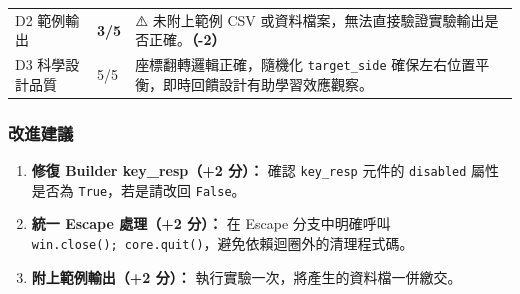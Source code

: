 \documentclass[14pt,]{extarticle}
\providecommand{\tightlist}{%
  \setlength{\itemsep}{0pt}\setlength{\parskip}{0pt}}
\begin{document}
\begin{longtable}[]{@{}lll@{}}
\begin{minipage}[t]{0.07\columnwidth}\raggedright
D2 範例輸出\strut
\end{minipage} & \begin{minipage}[t]{0.03\columnwidth}\raggedright
\textbf{3/5}\strut
\end{minipage} & \begin{minipage}[t]{0.82\columnwidth}\raggedright
⚠️ 未附上範例 CSV
或資料檔案，無法直接驗證實驗輸出是否正確。\textbf{（-2）}\strut
\end{minipage}\tabularnewline
\begin{minipage}[t]{0.07\columnwidth}\raggedright
D3 科學設計品質\strut
\end{minipage} & \begin{minipage}[t]{0.03\columnwidth}\raggedright
5/5\strut
\end{minipage} & \begin{minipage}[t]{0.82\columnwidth}\raggedright
座標翻轉邏輯正確，隨機化 \texttt{target\_side}
確保左右位置平衡，即時回饋設計有助學習效應觀察。\strut
\end{minipage}\tabularnewline
\bottomrule
\end{longtable}

\hypertarget{ux6539ux9032ux5efaux8b70}{%
\subsubsection{改進建議}\label{ux6539ux9032ux5efaux8b70}}

\begin{enumerate}
\def\labelenumi{\arabic{enumi}.}
\tightlist
\item
  \textbf{修復 Builder key\_resp（+2 分）：} 確認 \texttt{key\_resp}
  元件的 \texttt{disabled} 屬性是否為 \texttt{True}，若是請改回
  \texttt{False}。
\item
  \textbf{統一 Escape 處理（+2 分）：} 在 Escape 分支中明確呼叫
  \texttt{win.close();\ core.quit()}，避免依賴迴圈外的清理程式碼。
\item
  \textbf{附上範例輸出（+2 分）：}
  執行實驗一次，將產生的資料檔一併繳交。
\end{enumerate}
\end{document}
